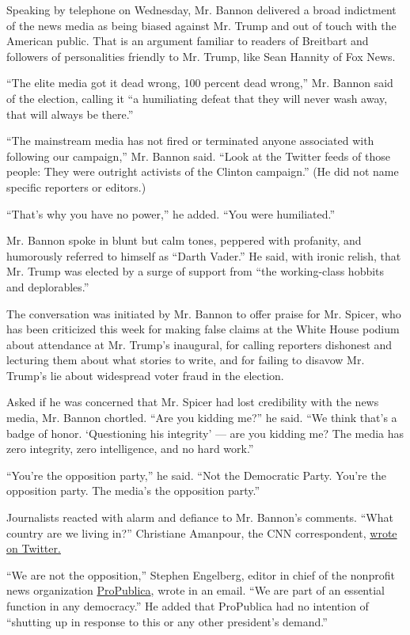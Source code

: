 Speaking by telephone on Wednesday, Mr. Bannon delivered a broad
indictment of the news media as being biased against Mr. Trump and out
of touch with the American public. That is an argument familiar to
readers of Breitbart and followers of personalities friendly to Mr.
Trump, like Sean Hannity of Fox News.

``The elite media got it dead wrong, 100 percent dead wrong,'' Mr.
Bannon said of the election, calling it ``a humiliating defeat that they
will never wash away, that will always be there.''

``The mainstream media has not fired or terminated anyone associated
with following our campaign,'' Mr. Bannon said. ``Look at the Twitter
feeds of those people: They were outright activists of the Clinton
campaign.'' (He did not name specific reporters or editors.)

``That's why you have no power,'' he added. ``You were humiliated.''

Mr. Bannon spoke in blunt but calm tones, peppered with profanity, and
humorously referred to himself as ``Darth Vader.'' He said, with ironic
relish, that Mr. Trump was elected by a surge of support from ``the
working-class hobbits and deplorables.''

The conversation was initiated by Mr. Bannon to offer praise for Mr.
Spicer, who has been criticized this week for making false claims at the
White House podium about attendance at Mr. Trump's inaugural, for
calling reporters dishonest and lecturing them about what stories to
write, and for failing to disavow Mr. Trump's lie about widespread voter
fraud in the election.

Asked if he was concerned that Mr. Spicer had lost credibility with the
news media, Mr. Bannon chortled. ``Are you kidding me?'' he said. ``We
think that's a badge of honor. `Questioning his integrity' --- are you
kidding me? The media has zero integrity, zero intelligence, and no hard
work.''

``You're the opposition party,'' he said. ``Not the Democratic Party.
You're the opposition party. The media's the opposition party.''

Journalists reacted with alarm and defiance to Mr. Bannon's comments.
``What country are we living in?'' Christiane Amanpour, the CNN
correspondent,
\href{https://twitter.com/camanpour/status/824730505543319554}{wrote on
Twitter.}

``We are not the opposition,'' Stephen Engelberg, editor in chief of the
nonprofit news organization
\href{https://www.propublica.org/}{ProPublica}, wrote in an email. ``We
are part of an essential function in any democracy.'' He added that
ProPublica had no intention of ``shutting up in response to this or any
other president's demand.''

